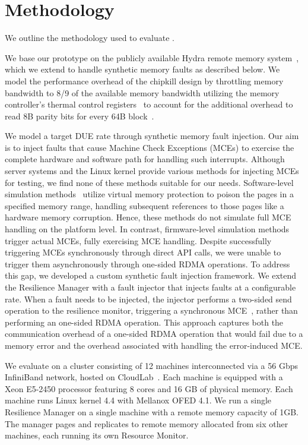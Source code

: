 \section{Methodology}
We outline the methodology used to evaluate \rampdm.

We base our \rampdm prototype on the publicly available Hydra remote memory system~\cite{lee:hydra:github}, which we extend to handle synthetic memory faults as described below. 
We model the performance overhead of the chipkill design by throttling memory bandwidth to 8/9 of the available memory bandwidth utilizing the memory controller's thermal control registers~\cite{volos:quartz:middleware:2015} to account for the additional overhead to read 8B parity bits for every 64B block~\cite{zhang:pm-chipkill:micro:2018}.

We model a target DUE rate through synthetic memory fault injection. Our aim is to inject faults that cause Machine Check Exceptions (MCEs) to exercise the complete hardware and software path for handling such interrupts. 
Although server systems and the Linux kernel provide various methods for injecting MCEs for testing, we find none of these methods suitable for our needs. 
Software-level simulation methods~\cite{linux:madvise-hwpoisson:2024, linux:mce-inject:2024} utilize virtual memory protection to poison the pages in a specified memory range, handling subsequent references to those pages like a hardware memory corruption. Hence, these methods do not simulate full MCE handling on the platform level.
In contrast, firmware-level simulation methods~\cite{linux:einj:2024} trigger actual MCEs, fully exercising MCE handling. Despite successfully triggering MCEs synchronously through direct API calls, we were unable to trigger them asynchronously through one-sided RDMA operations.
To address this gap, we developed a custom synthetic fault injection framework.
We extend the Resilience Manager with a fault injector that injects faults at a configurable rate. 
When a fault needs to be injected, the injector performs a two-sided send operation to the resilience monitor, triggering a synchronous MCE~\cite{linux:einj:2024}, rather than performing an one-sided RDMA operation.
This approach captures both the communication overhead of a one-sided RDMA operation that would fail due to a memory error and the overhead associated with handling the error-induced MCE.

We evaluate \rampdm on a cluster consisting of 12 machines interconnected via a 56 Gbps InfiniBand network, hosted on CloudLab~\cite{cloudlab:hardware}.
Each machine is equipped with a Xeon E5-2450 processor featuring 8 cores and 16 GB of physical memory. 
Each machine runs Linux kernel 4.4 with Mellanox OFED 4.1.
We run a single Resilience Manager on a single machine with a remote memory capacity of 1GB. 
The manager pages and replicates to remote memory allocated from six other machines, each running its own Resource Monitor.

